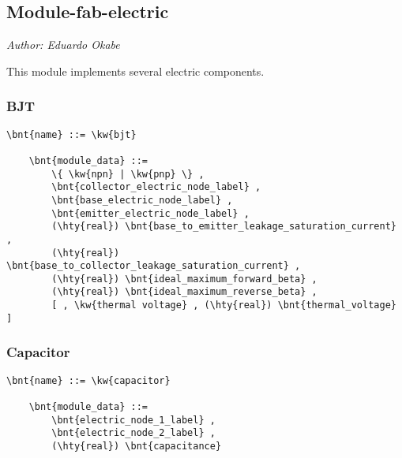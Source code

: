 % 
% 
% 
% 
% 
% 
% 
% 
% 


\subsection{Module-fab-electric}
\label{sec:MODULE:FAB-ELECTRIC}
\emph{Author: Eduardo Okabe}

\noindent
This module implements several electric components.


\subsubsection{BJT}
\begin{Verbatim}[commandchars=\\\{\}]
    \bnt{name} ::= \kw{bjt}

    \bnt{module_data} ::=
        \{ \kw{npn} | \kw{pnp} \} ,
        \bnt{collector_electric_node_label} ,
        \bnt{base_electric_node_label} ,
        \bnt{emitter_electric_node_label} ,
        (\hty{real}) \bnt{base_to_emitter_leakage_saturation_current} ,
        (\hty{real}) \bnt{base_to_collector_leakage_saturation_current} ,
        (\hty{real}) \bnt{ideal_maximum_forward_beta} ,
        (\hty{real}) \bnt{ideal_maximum_reverse_beta} ,
        [ , \kw{thermal voltage} , (\hty{real}) \bnt{thermal_voltage} ]
\end{Verbatim}


\subsubsection{Capacitor}
\begin{Verbatim}[commandchars=\\\{\}]
    \bnt{name} ::= \kw{capacitor}

    \bnt{module_data} ::=
        \bnt{electric_node_1_label} ,
        \bnt{electric_node_2_label} ,
        (\hty{real}) \bnt{capacitance}
\end{Verbatim}

